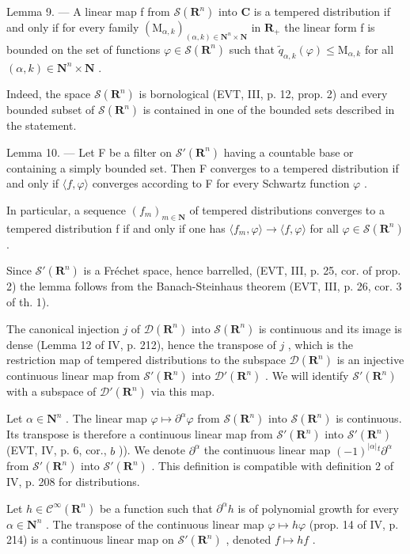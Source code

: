 Lemma 9. --- A linear map f from \(\mathcal{S}(\mathbf{R}^{n})\) into \(\mathbf{C}\) is a tempered distribution if and only if for every family \((\mathrm{M}_{\alpha,k})_{(\alpha,k)\in\mathbf{N}^{n}\times\mathbf{N}}\) in \(\mathbf{R}_{+}\) the linear form f is bounded on the set of functions \(\varphi\in\mathcal{S}(\mathbf{R}^{n})\) such that \(\widetilde{q}_{\alpha,k}(\varphi)\leqslant\mathrm{M}_{\alpha,k}\) for all \((\alpha,k)\in\mathbf{N}^{n}\times\mathbf{N}\) .

Indeed, the space \(\mathcal{S}(\mathbf{R}^{n})\) is bornological (EVT, III, p. 12, prop. 2) and every bounded subset of \(\mathcal{S}(\mathbf{R}^{n})\) is contained in one of the bounded sets described in the statement.

Lemma 10. --- Let F be a filter on \(\mathcal{S}'(\mathbf{R}^n)\) having a countable base or containing a simply bounded set. Then F converges to a tempered distribution if and only if \(\langle f, \varphi \rangle\) converges according to F for every Schwartz function \(\varphi\) .

In particular, a sequence \((f_{m})_{m\in\mathbf{N}}\) of tempered distributions converges to a tempered distribution f if and only if one has \(\langle f_{m},\varphi\rangle\to\langle f,\varphi\rangle\) for all \(\varphi\in\mathcal{S}(\mathbf{R}^{n})\) .

Since \(\mathcal{S}'(\mathbf{R}^n)\) is a Fréchet space, hence barrelled, (EVT, III, p. 25, cor. of prop. 2) the lemma follows from the Banach-Steinhaus theorem (EVT, III, p. 26, cor. 3 of th. 1).

The canonical injection \(j\) of \(\mathcal{D}(\mathbf{R}^{n})\) into \(\mathcal{S}(\mathbf{R}^{n})\) is continuous and its image is dense (Lemma 12 of IV, p. 212), hence the transpose of \(j\) , which is the restriction map of tempered distributions to the subspace \(\mathcal{D}(\mathbf{R}^{n})\) is an injective continuous linear map from \(\mathcal{S}'(\mathbf{R}^{n})\) into \(\mathcal{D}'(\mathbf{R}^{n})\) . We will identify \(\mathcal{S}'(\mathbf{R}^{n})\) with a subspace of \(\mathcal{D}'(\mathbf{R}^{n})\) via this map.

Let \(\alpha \in \mathbf{N}^n\) . The linear map \(\varphi \mapsto \partial^\alpha \varphi\) from \(\mathcal{S}(\mathbf{R}^n)\) into \(\mathcal{S}(\mathbf{R}^n)\) is continuous. Its transpose is therefore a continuous linear map from \(\mathcal{S}'(\mathbf{R}^n)\) into \(\mathcal{S}'(\mathbf{R}^n)\) (EVT, IV, p. 6, cor., \(b\) )). We denote \(\partial^\alpha\) the continuous linear map \((-1)^{|\alpha|}{}^{t}\partial^\alpha\) from \(\mathcal{S}'(\mathbf{R}^n)\) into \(\mathcal{S}'(\mathbf{R}^n)\) . This definition is compatible with definition 2 of IV, p. 208 for distributions.

Let \(h \in \mathcal{C}^{\infty}(\mathbf{R}^{n})\) be a function such that \(\partial^{\alpha}h\) is of polynomial growth for every \(\alpha \in \mathbf{N}^{n}\) . The transpose of the continuous linear map \(\varphi \mapsto h\varphi\) (prop. 14 of IV, p. 214) is a continuous linear map on \(\mathcal{S}'(\mathbf{R}^{n})\) , denoted \(f \mapsto hf\) .